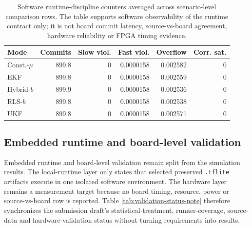 \documentclass[11pt]{article}
\begin{document}
\begin{table}[ht]
\centering
\scriptsize
\begin{tabular}{lrrrrr}
\toprule
Mode & Commits & Slow viol. & Fast viol. & Overflow & Corr. sat. \\
\midrule
Const.-\(\mu\) & 899.8 & 0 & 0.0000158 & 0.002582 & 0 \\
EKF & 899.8 & 0 & 0.0000158 & 0.002559 & 0 \\
Hybrid-\(b\) & 899.9 & 0 & 0.0000158 & 0.002536 & 0 \\
RLS-\(b\) & 899.8 & 0 & 0.0000158 & 0.002538 & 0 \\
UKF & 899.8 & 0 & 0.0000158 & 0.002571 & 0 \\
\bottomrule
\end{tabular}
\caption{Software runtime-discipline counters averaged across scenario-level
comparison rows.  The table supports software observability of the runtime
contract only; it is not board commit latency, source-vs-board agreement,
hardware reliability or FPGA timing evidence.}
\label{tab:runtime-counter-note}
\end{table}

\subsection{Embedded runtime and board-level validation}

Embedded runtime and board-level validation remain split from the simulation
results.  The local-runtime layer only states that selected preserved
\texttt{.tflite} artifacts execute in one isolated software environment.  The
hardware layer remains a measurement target because no board timing, resource,
power or source-vs-board row is reported.  Table
\ref{tab:validation-status-note} therefore synchronizes the submission draft's
statistical-treatment, runner-coverage, source-data and hardware-validation
status without turning requirements into results.
\end{document}
